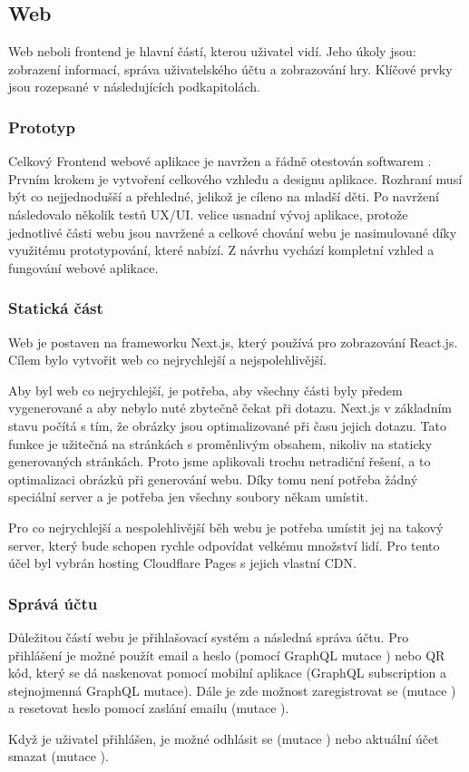 \subsection{Web}
Web neboli frontend je hlavní částí, kterou uživatel vidí. Jeho úkoly jsou: zobrazení informací, správa uživatelského účtu a zobrazování hry. Klíčové prvky jsou rozepsané v následujících podkapitolách.

\subsubsection{Prototyp}
Celkový Frontend webové aplikace je navržen a řádně otestován softwarem . Prvním krokem je vytvoření celkového vzhledu a designu aplikace. Rozhraní musí být co nejjednodušší a přehledné, jelikož je cíleno na mladší děti. Po navržení následovalo několik testů UX/UI.  velice usnadní vývoj aplikace, protože jednotlivé části webu jsou navržené a celkové chování webu je nasimulované díky využitému prototypování, které  nabízí. Z návrhu vychází kompletní vzhled a fungování webové aplikace.

\subsubsection{Statická část}
Web je postaven na frameworku Next.js, který používá pro zobrazování React.js. Cílem bylo vytvořit web co nejrychlejší a nejspolehlivější.\par
Aby byl web co nejrychlejší, je potřeba, aby všechny části byly předem vygenerované a aby nebylo nuté zbytečně čekat při dotazu. Next.js v základním stavu počítá s tím, že obrázky jsou optimalizované při času jejich dotazu. Tato funkce je užitečná na stránkách s proměnlivým obsahem, nikoliv na staticky generovaných stránkách. Proto jsme aplikovali trochu netradiční řešení, a to optimalizaci obrázků při generování webu. Díky tomu není potřeba žádný speciální server a je potřeba jen všechny soubory někam umístit.\par
Pro co nejrychlejší a nespolehlivější běh webu je potřeba umístit jej na takový server, který bude schopen rychle odpovídat velkému množství lidí. Pro tento účel byl vybrán hosting Cloudflare Pages\cite{Cloudflare-pages} s jejich vlastní CDN\cite{Cloudflare-cdn}. 

\subsubsection{Správá účtu}
Důležitou částí webu je přihlašovací systém a následná správa účtu. Pro přihlášení je možné použít email a heslo (pomocí GraphQL mutace ) nebo QR kód, který se dá naskenovat pomocí mobilní aplikace (GraphQL subscription  a stejnojmenná GraphQL mutace). Dále je zde možnost zaregistrovat se (mutace ) a resetovat heslo pomocí zaslání emailu (mutace ).\par
Když je uživatel přihlášen, je možné odhlásit se (mutace ) nebo aktuální účet smazat (mutace ).

